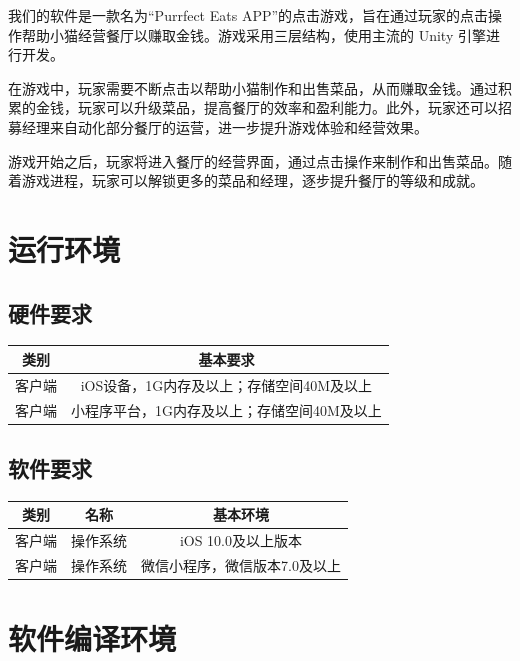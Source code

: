 \documentclass{mancls}%
\begin{document}
我们的软件是一款名为“Purrfect Eats APP”的点击游戏，旨在通过玩家的点击操作帮助小猫经营餐厅以赚取金钱。游戏采用三层结构，使用主流的 Unity 引擎进行开发。

在游戏中，玩家需要不断点击以帮助小猫制作和出售菜品，从而赚取金钱。通过积累的金钱，玩家可以升级菜品，提高餐厅的效率和盈利能力。此外，玩家还可以招募经理来自动化部分餐厅的运营，进一步提升游戏体验和经营效果。

游戏开始之后，玩家将进入餐厅的经营界面，通过点击操作来制作和出售菜品。随着游戏进程，玩家可以解锁更多的菜品和经理，逐步提升餐厅的等级和成就。

\pagebreak

\section{运行环境}
\subsection{硬件要求}
\begin{longtable}{|c|c|}
  \hline
  类别  & 基本要求                     \\
  \hline
  客户端 & iOS设备，1G内存及以上；存储空间40M及以上 \\
  \hline
  客户端 & 小程序平台，1G内存及以上；存储空间40M及以上 \\
  \hline
\end{longtable}

\vspace{1cm}

\subsection{软件要求}
\begin{longtable}{|c|c|c|}
  \hline
  类别  & 名称   & 基本环境             \\
  \hline
  客户端 & 操作系统 & iOS 10.0及以上版本    \\
  \hline
  客户端 & 操作系统 & 微信小程序，微信版本7.0及以上 \\
  \hline
\end{longtable}
\pagebreak
\section{软件编译环境}
\end{document}
